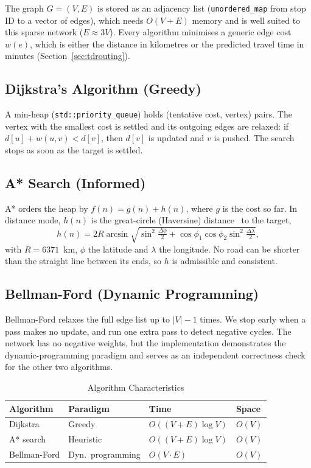 \documentclass[conference]{IEEEtran}
\begin{document}
The graph $G=(V,E)$ is stored as an adjacency list
(\texttt{unordered\_map} from stop ID to a vector of edges), which needs
$O(V+E)$ memory and is well suited to this sparse network
($E \approx 3V$). Every algorithm minimises a generic edge cost
$w(e)$, which is either the distance in kilometres or the predicted
travel time in minutes (Section~\ref{sec:tdrouting}).

\subsection{Dijkstra's Algorithm (Greedy)}
A min-heap (\texttt{std::priority\_queue}) holds (tentative cost, vertex)
pairs. The vertex with the smallest cost is settled and its outgoing
edges are relaxed: if $d[u]+w(u,v) < d[v]$, then $d[v]$ is updated and
$v$ is pushed. The search stops as soon as the target is settled.

\subsection{A* Search (Informed)}
A* orders the heap by $f(n)=g(n)+h(n)$, where $g$ is the cost so far.
In distance mode, $h(n)$ is the great-circle (Haversine)
distance~\cite{sinnott1984} to the target,
\begin{equation}
  h(n) = 2R \arcsin\!\sqrt{\sin^2\!\tfrac{\Delta\phi}{2} + \cos\phi_1\cos\phi_2 \sin^2\!\tfrac{\Delta\lambda}{2}},
\end{equation}
with $R=6371$~km, $\phi$ the latitude and $\lambda$ the longitude. No road
can be shorter than the straight line between its ends, so $h$ is
admissible and consistent.

\subsection{Bellman-Ford (Dynamic Programming)}
Bellman-Ford relaxes the full edge list up to $|V|-1$ times. We stop
early when a pass makes no update, and run one extra pass to detect
negative cycles. The network has no negative weights, but the
implementation demonstrates the dynamic-programming paradigm and serves
as an independent correctness check for the other two algorithms.

\begin{table}[t]
\caption{Algorithm Characteristics}
\label{tab:complexity}
\centering
\begin{tabular}{@{}llll@{}}
\toprule
Algorithm & Paradigm & Time & Space \\
\midrule
Dijkstra     & Greedy            & $O((V+E)\log V)$ & $O(V)$ \\
A* search    & Heuristic         & $O((V+E)\log V)$ & $O(V)$ \\
Bellman-Ford & Dyn.\ programming & $O(V\cdot E)$    & $O(V)$ \\
\bottomrule
\end{tabular}
\end{table}
\end{document}
